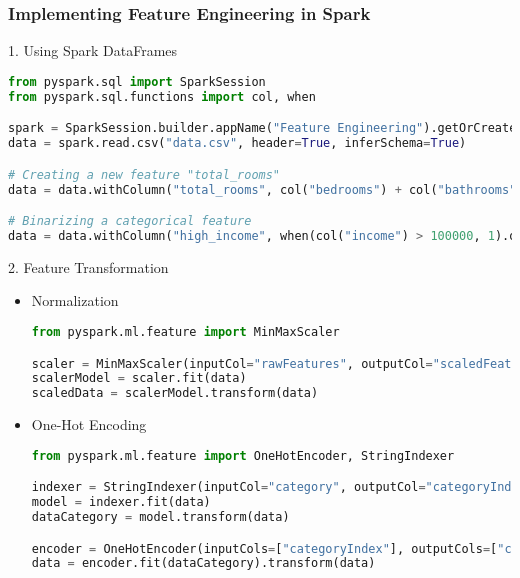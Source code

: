 \documentclass[aspectratio=169]{beamer}
\begin{document}
\begin{frame}[fragile]
    \frametitle{Implementing Feature Engineering in Spark}
    \begin{block}{1. Using Spark DataFrames}
    \begin{lstlisting}[language=Python]
from pyspark.sql import SparkSession
from pyspark.sql.functions import col, when

spark = SparkSession.builder.appName("Feature Engineering").getOrCreate()
data = spark.read.csv("data.csv", header=True, inferSchema=True)

# Creating a new feature "total_rooms"
data = data.withColumn("total_rooms", col("bedrooms") + col("bathrooms"))

# Binarizing a categorical feature
data = data.withColumn("high_income", when(col("income") > 100000, 1).otherwise(0))
    \end{lstlisting}
    \end{block}

    \begin{block}{2. Feature Transformation}
        \begin{itemize}
            \item Normalization
            \begin{lstlisting}[language=Python]
from pyspark.ml.feature import MinMaxScaler

scaler = MinMaxScaler(inputCol="rawFeatures", outputCol="scaledFeatures")
scalerModel = scaler.fit(data)
scaledData = scalerModel.transform(data)
            \end{lstlisting}

            \item One-Hot Encoding
            \begin{lstlisting}[language=Python]
from pyspark.ml.feature import OneHotEncoder, StringIndexer

indexer = StringIndexer(inputCol="category", outputCol="categoryIndex")
model = indexer.fit(data)
dataCategory = model.transform(data)

encoder = OneHotEncoder(inputCols=["categoryIndex"], outputCols=["category_ohe"])
data = encoder.fit(dataCategory).transform(data)
            \end{lstlisting}
        \end{itemize}
    \end{block}
\end{frame}
\end{document}
